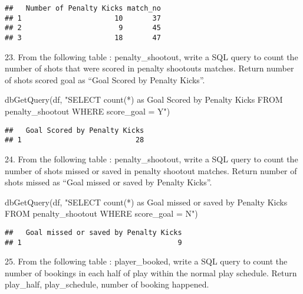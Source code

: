 \documentclass[
]{article}
\newenvironment{Shaded}{\begin{snugshade}}{\end{snugshade}}
\newcommand{\FunctionTok}[1]{\textcolor[rgb]{0.00,0.00,0.00}{#1}}
\newcommand{\NormalTok}[1]{#1}
\newcommand{\StringTok}[1]{\textcolor[rgb]{0.31,0.60,0.02}{#1}}
\begin{document}
\begin{verbatim}
##   Number of Penalty Kicks match_no
## 1                      10       37
## 2                       9       45
## 3                      18       47
\end{verbatim}

23. From the following table : penalty\_shootout, write a SQL query to
count the number of shots that were scored in penalty shootouts matches.
Return number of shots scored goal as ``Goal Scored by Penalty Kicks''.

\begin{Shaded}
\begin{Highlighting}[]
\FunctionTok{dbGetQuery}\NormalTok{(df, }\StringTok{"SELECT count(*) as \textquotesingle{}Goal Scored by Penalty Kicks\textquotesingle{}}
\StringTok{                FROM penalty\_shootout}
\StringTok{                WHERE score\_goal = \textquotesingle{}Y\textquotesingle{}"}\NormalTok{)}
\end{Highlighting}
\end{Shaded}

\begin{verbatim}
##   Goal Scored by Penalty Kicks
## 1                           28
\end{verbatim}

24. From the following table : penalty\_shootout, write a SQL query to
count the number of shots missed or saved in penalty shootout matches.
Return number of shots missed as ``Goal missed or saved by Penalty
Kicks''.

\begin{Shaded}
\begin{Highlighting}[]
\FunctionTok{dbGetQuery}\NormalTok{(df, }\StringTok{"SELECT count(*) as \textquotesingle{}Goal missed or saved by Penalty Kicks\textquotesingle{}}
\StringTok{                FROM penalty\_shootout}
\StringTok{                WHERE score\_goal = \textquotesingle{}N\textquotesingle{}"}\NormalTok{)}
\end{Highlighting}
\end{Shaded}

\begin{verbatim}
##   Goal missed or saved by Penalty Kicks
## 1                                     9
\end{verbatim}

25. From the following table : player\_booked, write a SQL query to
count the number of bookings in each half of play within the normal play
schedule. Return play\_half, play\_schedule, number of booking happened.
\end{document}
